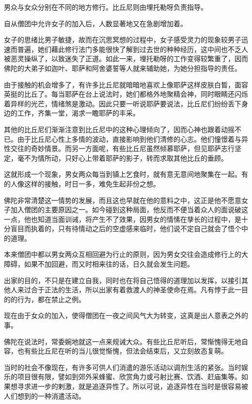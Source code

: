 \documentclass[twoside,openany]{book}
\begin{document}
男众与女众分别在不同的地方修行。比丘尼则由埋托勒呀负责指导。

自从僧团中允许女子的加入后，人数显著地又在急剧增加着。

女子的思绪比男子敏捷，故而在沉思冥想的过程中，女子感受灵力的现象较男子迅速而普遍，她们藉此修行法门多能很快了解到过去世的种种经历，这中间也不乏人被恶灵操纵了，以致迷失了正道。如此一来，埋托勒呀的工作变得较繁重了，因而佛陀的大弟子如迦叶、耶萨和阿舍婆誓等人就来辅助她，为她分担指导的责任。

由于接触的机会增多了，有许多比丘尼就暗暗地喜欢上像耶萨这样皮肤白晳，面容英挺的比丘了。每当耶萨在台上说法时，她们都格外地聚精会神，同时眼睛还闪烁着异样的光芒，情绪煞是激动。因此只要一听说耶萨要说法，比丘尼们纷纷丢下身边的工作，齐集一堂，渴求一瞻耶萨的丰采。

其他的比丘尼们渐渐注意到比丘尼中的这种心理倾向了，因而心神也跟着动摇不已。由于比丘尼心性上多情的波动，直接影响到他们清修的心志。他们憧憬着与异性交往的奇妙情景。而另一方面呢，有些比丘尼虽然倾慕耶萨，但见耶萨志行坚定，毫不为情所动，只好心上带着耶萨的影子，转而求取其他比丘的垂顾。

这就形成一个现象，男女两众每当到镇上乞食时，就有意无意间地聚集在一起。有的人像这样的接触，时日一多，难免生起非份之想。

佛陀非常清楚这一情势的发展，而且这也早就在他的意料之中，这正是他不愿意女子加入僧团的主要原因之一。如今碰到这种局面，他反而不便当着众人的面说破这一点，他也知道当面训诫，将产生不了效果，因男女的情愫在孳长的过程中，是十分盲目而执着的，只有待情动之后的空虚感来临时，他们说不定自己就会了悟个中的道理。

本来僧团中都以男女两众互相回避为行止的原则，因为男女交往会造成修行上的大障碍，如果不加回避，而又时相来往的话，日久就会发生问题。

出家的目的，不只是在建立自我，同时也在将自己悟得的道理加以发挥，以接引其他人来过合于正法的生活，所以出家有着救渡人的神圣使命在焉。凡有悖于此一目的的行为，都在禁止之例。

现在由于女众的加入，使得僧团在一夜之间风气大为转变，这真是出人意表之外的事。

佛陀在说法时，常委婉地就这一点来规诫大众。有些比丘尼听后，常惭愧得无地自容，也有些比丘尼在听的当儿很觉惭愧，但法会结束后，又立刻故态复萌。

当时的社会不像现在，有许多可供人们消遣的游乐活动以调剂生活的紧张。当时娱乐的项目很有限，譬如到郊外采蜂蜜、欣赏角力或弓射比赛、饮酒、赶庙集等。如果想寻求进一步的剌激，就是追逐异性了。所以可说，追逐异性在当时是很容易被人们想到的一种消遣活动。
\end{document}
